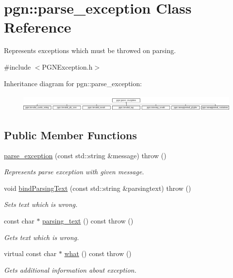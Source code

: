 \hypertarget{classpgn_1_1parse__exception}{
\section{pgn::parse\_\-exception Class Reference}
\label{classpgn_1_1parse__exception}
}


Represents exceptions which must be throwed on parsing.  




{\ttfamily \#include $<$PGNException.h$>$}

Inheritance diagram for pgn::parse\_\-exception:\begin{figure}[H]
\begin{center}
\leavevmode
\includegraphics[height=0.893855cm]{classpgn_1_1parse__exception}
\end{center}
\end{figure}
\subsection*{Public Member Functions}
\begin{DoxyCompactItemize}
\item 
\hyperlink{classpgn_1_1parse__exception_a7bae04deaf606dd6988cfefa933b7101}{parse\_\-exception} (const std::string \&message)  throw ()
\begin{DoxyCompactList}\small\item\em Represents parse exception with given message. \item\end{DoxyCompactList}\item 
void \hyperlink{classpgn_1_1parse__exception_aaf1aa4e8c2a2eaf549ba766b94b13fb2}{bindParsingText} (const std::string \&parsingtext)  throw ()
\begin{DoxyCompactList}\small\item\em Sets text which is wrong. \item\end{DoxyCompactList}\item 
const char $\ast$ \hyperlink{classpgn_1_1parse__exception_abfdb03d89f8b9f5460cbdc83c82f177a}{parsing\_\-text} () const   throw ()
\begin{DoxyCompactList}\small\item\em Gets text which is wrong. \item\end{DoxyCompactList}\item 
virtual const char $\ast$ \hyperlink{classpgn_1_1parse__exception_a6b9a11cd8e08364f76d073891407ea41}{what} () const   throw ()
\begin{DoxyCompactList}\small\item\em Gets additional information about exception. \item\end{DoxyCompactList}\end{DoxyCompactItemize}


